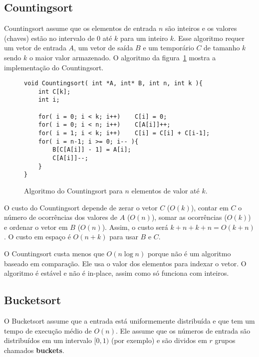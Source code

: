 \subsection{Countingsort}

Countingsort assume que os elementos de entrada $n$ são inteiros e
os valores (chaves) estão no intervalo de $0$ até $k$ para um inteiro $k$.
Esse algoritmo requer um vetor de entrada $A$, um vetor de saída $B$ e um
temporário $C$ de tamanho $k$ sendo $k$ o maior valor armazenado.
O algoritmo da figura~\ref{aula03:algo:counting} mostra a implementação do
Countingsort.
%
\begin{figure}[!htb]
\centering
\begin{framed}
\begin{lstlisting}
void Countingsort( int *A, int* B, int n, int k ){
	int C[k];
	int i;

	for( i = 0; i < k; i++)    C[i] = 0;
	for( i = 0; i < n; i++)    C[A[i]]++;
	for( i = 1; i < k; i++)    C[i] = C[i] + C[i-1];
	for( i = n-1; i >= 0; i-- ){
		B[C[A[i]] - 1] = A[i];
		C[A[i]]--;
	}
}
\end{lstlisting}
\end{framed}
\caption{Algoritmo do Countingsort para $n$ elementos de valor até $k$.}
\label{aula03:algo:counting}
\end{figure}

O custo do Countingsort depende de zerar o vetor $C$ ($O(k)$), 
contar em $C$ o número de ocorrências dos valores de $A$ ($O(n)$),
somar as ocorrências ($O(k)$) e ordenar o vetor em $B$ ($O(n)$).
Assim, o custo será $k + n + k + n = O(k + n)$.
O custo em espaço é $O(n + k)$ para usar $B$ e $C$.

O Countingsort custa menos que $O(n \log n)$ porque não é um algoritmo baseado
em comparação.  Ele usa o valor dos elementos para indexar o vetor.
O algoritmo é estável e não é in-place, assim como só funciona com inteiros.

\subsection{Bucketsort}

O Bucketsort assume que a entrada está uniformemente distribuída e que tem um
tempo de execução médio de $O(n)$.
Ele assume que os números de entrada são distribuídos em um intervalo $[0,1)$ (por exemplo)
e são dividos em $r$ grupos chamados {\bf buckets}.


